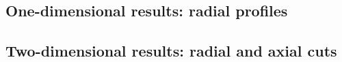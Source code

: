 
\subsection{One-dimensional results: radial profiles}
\label{sub:dream_ls_hb_radial_profiles}



\subsection{Two-dimensional results: radial and axial cuts}
\label{sub:dream_ls_hb_axial_radial_cuts}
